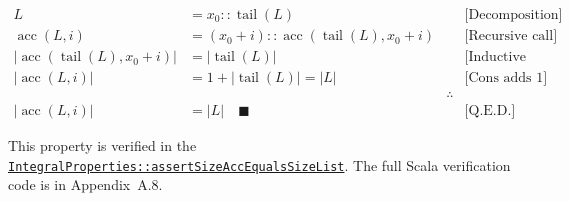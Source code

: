 \begin{equation*}
\begin{aligned}
L &= x_0 :: \operatorname{tail}(L)
  && \text{[Decomposition]} \\
\operatorname{acc}(L, i) &= (x_0 + i) :: \operatorname{acc}(\operatorname{tail}(L), x_0 + i)
  && \text{[Recursive call]} \\
\lvert \operatorname{acc}(\operatorname{tail}(L), x_0 + i)\rvert &= \lvert \operatorname{tail}(L)\rvert
  && \text{[Inductive hypothesis]} \\
\lvert \operatorname{acc}(L, i)\rvert &= 1 + \lvert \operatorname{tail}(L)\rvert = \lvert L\rvert
  && \text{[Cons adds 1]} \\
&& \therefore \\
\lvert \operatorname{acc}(L, i)\rvert &= \lvert L\rvert \quad \blacksquare
  && \text{[Q.E.D.]}
\end{aligned}
\end{equation*}

{\raggedright
This property is verified in the
\href{https://github.com/thiagomata/prime-numbers/blob/master/src/main/scala/v1/chapter3/list/integral/properties/IntegralProperties.scala}{\texttt{IntegralProperties::\allowbreak assertSizeAccEqualsSizeList}}.
The full Scala verification code is in Appendix~A.8.
\par}
